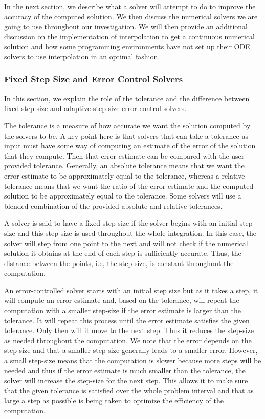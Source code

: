 In the next section, we describe what a solver will attempt to do to improve the accuracy of the computed solution. We then discuss the numerical solvers we are going to use throughout our investigation. We will then provide an additional discussion on the implementation of interpolation to get a continuous numerical solution and how some programming environments have not set up their ODE solvers to use interpolation in an optimal fashion.

\subsubsection{Fixed Step Size and Error Control Solvers}
\label{subsection:fixed_vs_control}
In this section, we explain the role of the tolerance and the difference between fixed step size and adaptive step-size error control solvers.

The tolerance is a measure of how accurate we want the solution computed by the solvers to be. A key point here is that solvers that can take a tolerance as input must have some way of computing an estimate of the error of the solution that they compute. Then that error estimate can be compared with the user-provided tolerance. Generally, an absolute tolerance means that we want the error estimate to be approximately equal to the tolerance, whereas a relative tolerance means that we want the ratio of the error estimate and the computed solution to be approximately equal to the tolerance. Some solvers will use a blended combination of the provided absolute and relative tolerances.

A solver is said to have a fixed step size if the solver begins with an initial step-size and this step-size is used throughout the whole integration. In this case, the solver will step from one point to the next and will not check if the numerical solution it obtains at the end of each step is sufficiently accurate. Thus, the distance between the points, i.e, the step size, is constant throughout the computation.

An error-controlled solver starts with an initial step size but as it takes a step, it will compute an error estimate and, based on the tolerance, will repeat the computation with a smaller step-size if the error estimate is larger than the tolerance. It will repeat this process until the error estimate satisfies the given tolerance. Only then will it move to the next step. Thus it reduces the step-size as needed throughout the computation. We note that the error depends on the step-size and that a smaller step-size generally leads to a smaller error. However, a small step-size means that the computation is slower because more steps will be needed and thus if the error estimate is much smaller than the tolerance, the solver will increase the step-size for the next step. This allows it to make sure that the given tolerance is satisfied over the whole problem interval and that as large a step as possible is being taken to optimize the efficiency of the computation.

